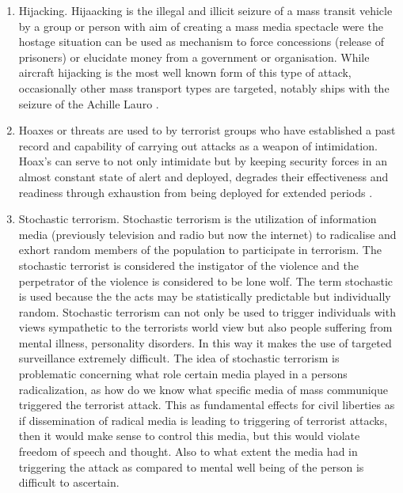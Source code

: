 \begin{enumerate}
\item Hijacking. Hijaacking is the illegal and illicit seizure of a mass transit vehicle by a group or person with aim of creating a mass  media spectacle were the hostage situation can be used as mechanism to force concessions (release of prisoners) or elucidate money from a government or organisation. While  aircraft hijacking is the most well known form of this type of attack, occasionally other mass transport types are targeted, notably ships with the seizure of the Achille Lauro \citep{halberstam1988terrorism}.
\item Hoaxes or threats are used to by terrorist groups who have established a past record and capability of carrying out attacks as a weapon of intimidation. Hoax's can serve to not only intimidate but by keeping security forces in an almost constant state  of alert and deployed, degrades their effectiveness and readiness through exhaustion from being deployed for extended periods \citep{nagl2008us}.
\item Stochastic terrorism. Stochastic terrorism is the utilization of information media (previously television and radio but now the internet) to radicalise and exhort random members of the population to participate in terrorism. The stochastic terrorist is considered the instigator of the violence and the perpetrator of the violence is considered to be lone wolf. The term stochastic is used because the the acts may be statistically predictable but individually random. Stochastic terrorism can not only be used to trigger individuals with views sympathetic to the terrorists world view but also people suffering from mental illness, personality disorders. In this way it makes the use of targeted surveillance extremely difficult. The idea of stochastic terrorism is  problematic concerning what role certain media played in a persons radicalization, as how do we know what specific media of mass communique triggered the terrorist attack. This as fundamental effects for civil liberties as if dissemination of radical media is leading to triggering of terrorist attacks, then it would make sense to control this media, but this would violate freedom of speech and thought. Also to what extent the media had in triggering the attack as compared to mental well being of the person is difficult to ascertain. 
\end{enumerate}

